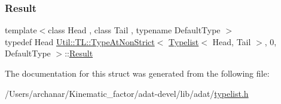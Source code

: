 \subsubsection{\texorpdfstring{Result}{Result}\hspace{0.1cm}{\footnotesize\ttfamily [3/3]}}
{\footnotesize\ttfamily template$<$class Head , class Tail , typename Default\+Type $>$ \\
typedef Head \mbox{\hyperlink{structUtil_1_1TL_1_1TypeAtNonStrict}{Util\+::\+T\+L\+::\+Type\+At\+Non\+Strict}}$<$ \mbox{\hyperlink{structUtil_1_1Typelist}{Typelist}}$<$ Head, Tail $>$, 0, Default\+Type $>$\+::\mbox{\hyperlink{structUtil_1_1TL_1_1TypeAtNonStrict_3_01Typelist_3_01Head_00_01Tail_01_4_00_010_00_01DefaultType_01_4_a436fb34f639a42264d429c417d21785a}{Result}}}



The documentation for this struct was generated from the following file\+:\begin{DoxyCompactItemize}
\item 
/\+Users/archanar/\+Kinematic\+\_\+factor/adat-\/devel/lib/adat/\mbox{\hyperlink{adat-devel_2lib_2adat_2typelist_8h}{typelist.\+h}}\end{DoxyCompactItemize}
